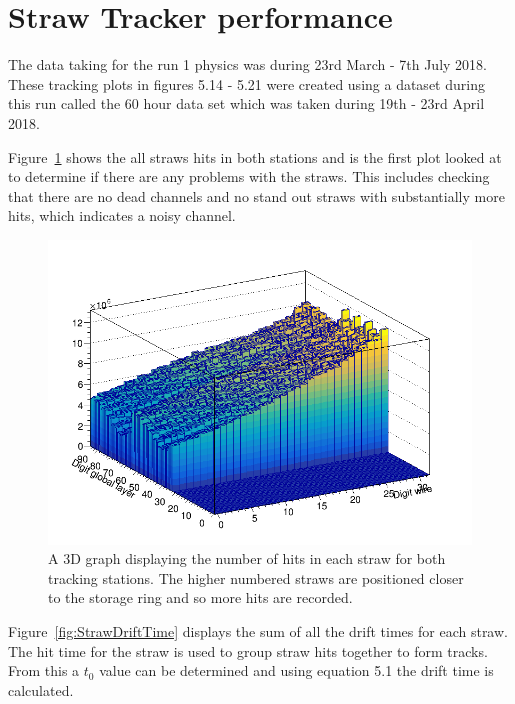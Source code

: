 \section{Straw Tracker performance}

The data taking for the run 1 physics was during 23rd March - 7th July 2018. These tracking plots in figures 5.14 - 5.21 were created using a dataset during this run called the 60 hour data set which was taken during 19th - 23rd April 2018. 

Figure~\ref{fig:DigitChannelMap} shows the all straws hits in both stations and is the first plot looked at to determine if there are any problems with the straws. This includes checking that there are no dead channels and no stand out straws with substantially more hits, which indicates a noisy channel.

\begin{figure}[th]
\centering
\includegraphics[scale=0.5]{Figures/DigitChannelMap_.png}
\decoRule
\caption{A 3D graph displaying the number of hits in each straw for both tracking stations. The higher numbered straws are positioned closer to the storage ring and so more hits are recorded.}
\label{fig:DigitChannelMap}
\end{figure}

Figure~\ref{fig:StrawDriftTime} displays the sum of all the drift times for each straw. The hit time for the straw is used to group straw hits together to form tracks. From this a $t_0$ value can be determined and using equation 5.1 the drift time is calculated.

